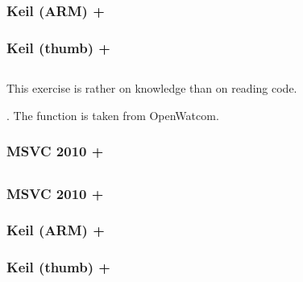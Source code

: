 \subsubsection{Keil (ARM) + \Othree}



\subsubsection{Keil (thumb) + \Othree}



\subsection{}

{This exercise is rather on knowledge than on reading code.}

.
{The function is taken from OpenWatcom}.

\subsubsection{MSVC 2010 + \Ox}



\subsection{}

\subsubsection{MSVC 2010 + \Ox}



\subsubsection{Keil (ARM) + \Othree}



\subsubsection{Keil (thumb) + \Othree}



